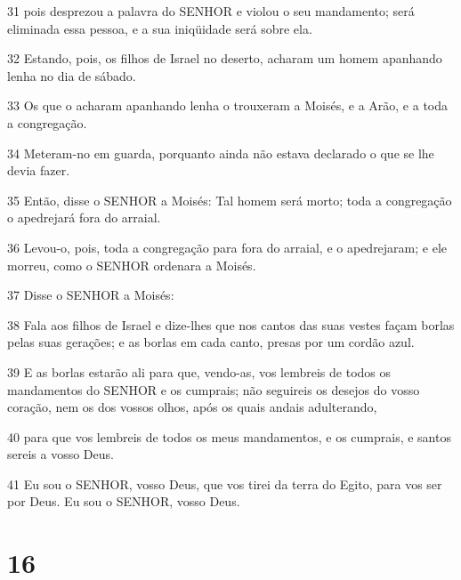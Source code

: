 \par 31 pois desprezou a palavra do SENHOR e violou o seu mandamento; será eliminada essa pessoa, e a sua iniqüidade será sobre ela.
\par 32 Estando, pois, os filhos de Israel no deserto, acharam um homem apanhando lenha no dia de sábado.
\par 33 Os que o acharam apanhando lenha o trouxeram a Moisés, e a Arão, e a toda a congregação.
\par 34 Meteram-no em guarda, porquanto ainda não estava declarado o que se lhe devia fazer.
\par 35 Então, disse o SENHOR a Moisés: Tal homem será morto; toda a congregação o apedrejará fora do arraial.
\par 36 Levou-o, pois, toda a congregação para fora do arraial, e o apedrejaram; e ele morreu, como o SENHOR ordenara a Moisés.
\par 37 Disse o SENHOR a Moisés:
\par 38 Fala aos filhos de Israel e dize-lhes que nos cantos das suas vestes façam borlas pelas suas gerações; e as borlas em cada canto, presas por um cordão azul.
\par 39 E as borlas estarão ali para que, vendo-as, vos lembreis de todos os mandamentos do SENHOR e os cumprais; não seguireis os desejos do vosso coração, nem os dos vossos olhos, após os quais andais adulterando,
\par 40 para que vos lembreis de todos os meus mandamentos, e os cumprais, e santos sereis a vosso Deus.
\par 41 Eu sou o SENHOR, vosso Deus, que vos tirei da terra do Egito, para vos ser por Deus. Eu sou o SENHOR, vosso Deus.

\chapter{16}


